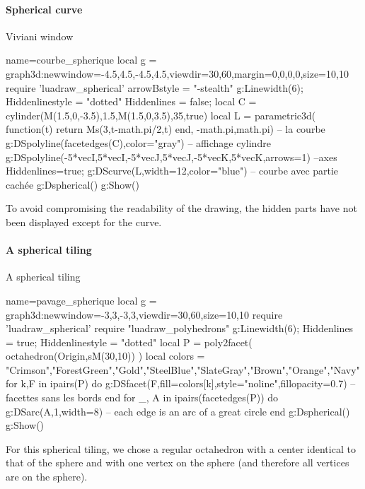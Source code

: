 \paragraph{Spherical curve}

\begin{demo}{Viviani window}
\begin{luadraw}{name=courbe_spherique}
local g = graph3d:new{window={-4.5,4.5,-4.5,4.5},viewdir={30,60},margin={0,0,0,0},size={10,10}}
require 'luadraw_spherical'
arrowBstyle = "-stealth"
g:Linewidth(6); Hiddenlinestyle = "dotted"
Hiddenlines = false; 
local C = cylinder(M(1.5,0,-3.5),1.5,M(1.5,0,3.5),35,true)
local L = parametric3d( function(t) return Ms(3,t-math.pi/2,t) end, -math.pi,math.pi) -- la courbe
g:DSpolyline(facetedges(C),{color="gray"}) -- affichage cylindre
g:DSpolyline({{-5*vecI,5*vecI},{-5*vecJ,5*vecJ},{-5*vecK,5*vecK}},{arrows=1}) --axes
Hiddenlines=true; g:DScurve(L,{width=12,color="blue"}) -- courbe avec partie cachée
g:Dspherical()
g:Show()
\end{luadraw}
\end{demo}

To avoid compromising the readability of the drawing, the hidden parts have not been displayed except for the curve.

\paragraph{A spherical tiling}

\begin{demo}{A spherical tiling}
\begin{luadraw}{name=pavage_spherique}
local g = graph3d:new{window={-3,3,-3,3},viewdir={30,60},size={10,10}}
require 'luadraw_spherical'
require "luadraw_polyhedrons"
g:Linewidth(6); Hiddenlines = true; Hiddenlinestyle = "dotted"
local P = poly2facet( octahedron(Origin,sM(30,10)) )
local colors = {"Crimson","ForestGreen","Gold","SteelBlue","SlateGray","Brown","Orange","Navy"}
for k,F in ipairs(P) do
    g:DSfacet(F,{fill=colors[k],style="noline",fillopacity=0.7})  -- facettes sans les bords
end
for _, A in ipairs(facetedges(P)) do
    g:DSarc(A,1,{width=8}) -- each edge is an arc of a great circle
end
g:Dspherical()
g:Show()
\end{luadraw}
\end{demo}

For this spherical tiling, we chose a regular octahedron with a center identical to that of the sphere and with one vertex on the sphere (and therefore all vertices are on the sphere).

